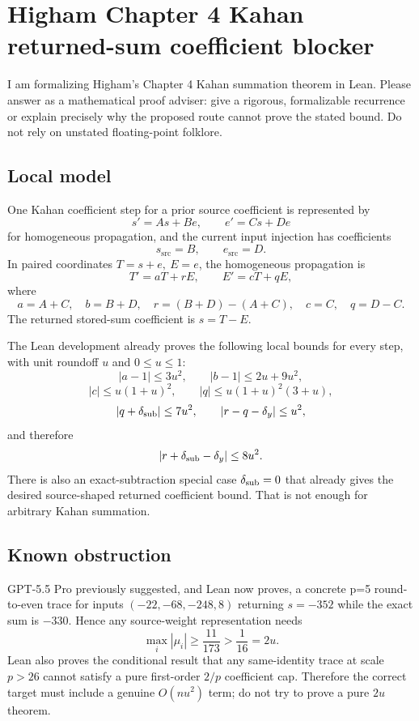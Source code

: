\documentclass{article}
\begin{document}
\section*{Higham Chapter 4 Kahan returned-sum coefficient blocker}

I am formalizing Higham's Chapter 4 Kahan summation theorem in Lean.  Please
answer as a mathematical proof adviser: give a rigorous, formalizable recurrence
or explain precisely why the proposed route cannot prove the stated bound.  Do
not rely on unstated floating-point folklore.

\subsection*{Local model}

One Kahan coefficient step for a prior source coefficient is represented by
\[
  s' = A s + B e,\qquad e' = C s + D e
\]
for homogeneous propagation, and the current input injection has coefficients
\[
  s_{\mathrm{src}} = B,\qquad e_{\mathrm{src}} = D.
\]
In paired coordinates \(T=s+e,\ E=e\), the homogeneous propagation is
\[
  T' = aT + rE,\qquad E'=cT + qE,
\]
where
\[
  a=A+C,\quad b=B+D,\quad r=(B+D)-(A+C),\quad c=C,\quad q=D-C.
\]
The returned stored-sum coefficient is \(s=T-E\).

The Lean development already proves the following local bounds for every step,
with unit roundoff \(u\) and \(0\le u\le 1\):
\[
  |a-1|\le 3u^2,\qquad |b-1|\le 2u+9u^2,
\]
\[
  |c|\le u(1+u)^2,\qquad |q|\le u(1+u)^2(3+u),
\]
\[
  |q+\delta_{\rm sub}|\le 7u^2,\qquad
  |r-q-\delta_y|\le u^2,
\]
and therefore
\[
  |r+\delta_{\rm sub}-\delta_y|\le 8u^2.
\]
There is also an exact-subtraction special case \(\delta_{\rm sub}=0\) that
already gives the desired source-shaped returned coefficient bound.  That is
not enough for arbitrary Kahan summation.

\subsection*{Known obstruction}

GPT-5.5 Pro previously suggested, and Lean now proves, a concrete p=5
round-to-even trace for inputs \((-22,-68,-248,8)\) returning \(s=-352\) while
the exact sum is \(-330\).  Hence any source-weight representation needs
\[
  \max_i |\mu_i| \ge \frac{11}{173} > \frac1{16}=2u.
\]
Lean also proves the conditional result that any same-identity trace at scale
\(p>26\) cannot satisfy a pure first-order \(2/p\) coefficient cap.  Therefore
the correct target must include a genuine \(O(nu^2)\) term; do not try to prove
a pure \(2u\) theorem.
\end{document}
